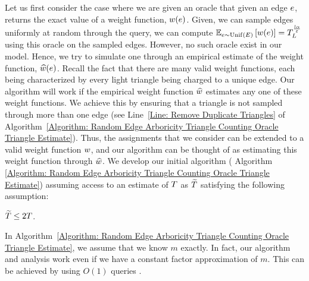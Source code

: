 Let us first consider the case where we are given an oracle that given an edge $e$, returns the exact value of a weight function, $w(e)$. Given, we can sample edges uniformly at random through the \randedgeq{} query, we can compute $\operatorname*{\mathbb{E}}_{e \sim \mathrm{Unif}(E)}\left[{w(e)}\right] = T^{\frac{l\alpha}{\varepsilon}}_{L}$ using this oracle on the sampled edges. However, no such oracle exist in our model. Hence, we try to simulate one through an empirical estimate of the weight function, $\widehat{w}(e)$. Recall the fact that there are many valid weight functions, each being characterized by every light triangle being charged to a unique edge. Our algorithm will work if the empirical weight function $\widehat{w}$ estimates any one of these weight functions. We achieve this by ensuring that a triangle is not sampled through more than one edge (see Line~\ref{Line: Remove Duplicate Triangles} of Algorithm~\ref{Algorithm: Random Edge Arboricity Triangle Counting Oracle Triangle Estimate}). Thus, the assignments that we consider can be extended to a valid weight function $w$, and our algorithm can be thought of as estimating this weight function through $\widehat{w}$. We develop our initial algorithm ( Algorithm \ref{Algorithm: Random Edge Arboricity Triangle Counting Oracle Triangle Estimate}) assuming access to an estimate of $T$ as $\widetilde{T}$ satisfying the following assumption:
\begin{assumption}\label{Assumption: Triangle 2 Factor Estimate}
$\widetilde{T} \leq 2T$.
\end{assumption}
In Algorithm~\ref{Algorithm: Random Edge Arboricity Triangle Counting Oracle Triangle Estimate}, we assume that we know $m$ exactly. In fact, our algorithm and analysis work even if we have a constant factor approximation of $m$. This can be achieved by using $O(1)$  queries \cite{assadi2018simple}.

